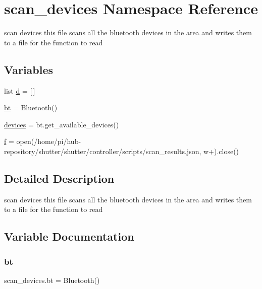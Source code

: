 \hypertarget{namespacescan__devices}{}\section{scan\+\_\+devices Namespace Reference}
\label{namespacescan__devices}


scan devices this file scans all the bluetooth devices in the area and writes them to a file for the function to read  


\subsection*{Variables}
\begin{DoxyCompactItemize}
\item 
list \hyperlink{namespacescan__devices_a2a6b210c6f8389e71d2ff443c6f826ea}{d} = \mbox{[}$\,$\mbox{]}
\item 
\hyperlink{namespacescan__devices_a842920fc9bc7008ec008121008b9756a}{bt} = Bluetooth()
\item 
\hyperlink{namespacescan__devices_a5fe0057a4b1a6e7649ed14ca2ff5138e}{devices} = bt.\+get\+\_\+available\+\_\+devices()
\item 
\hyperlink{namespacescan__devices_a2bda5d4889a043b2c0038c981581ba8e}{f} = open(\textquotesingle{}/home/pi/hub-\/repository/shutter/shutter/controller/scripts/scan\+\_\+results.\+json\textquotesingle{}, \textquotesingle{}w+\textquotesingle{}).close()
\end{DoxyCompactItemize}


\subsection{Detailed Description}
scan devices this file scans all the bluetooth devices in the area and writes them to a file for the function to read 

\subsection{Variable Documentation}
\mbox{\label{namespacescan__devices_a842920fc9bc7008ec008121008b9756a}} 
\subsubsection{\texorpdfstring{bt}{bt}}
{\footnotesize\ttfamily scan\+\_\+devices.\+bt = Bluetooth()}

